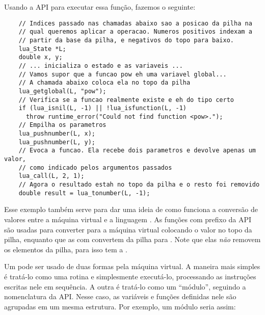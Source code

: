       Usando a API para executar essa função, fazemos o seguinte:
      
      \vspace{1em}

    \begin{lstlisting}
    // Indices passado nas chamadas abaixo sao a posicao da pilha na
    // qual queremos aplicar a operacao. Numeros positivos indexam a
    // partir da base da pilha, e negativos do topo para baixo.
    lua_State *L;
    double x, y;
    // ... inicializa o estado e as variaveis ...
    // Vamos supor que a funcao pow eh uma variavel global...
    // A chamada abaixo coloca ela no topo da pilha
    lua_getglobal(L, "pow");
    // Verifica se a funcao realmente existe e eh do tipo certo
    if (lua_isnil(L, -1) || !lua_isfunction(L, -1)
      throw runtime_error("Could not find function <pow>.");
    // Empilha os parametros
    lua_pushnumber(L, x);
    lua_pushnumber(L, y);
    // Evoca a funcao. Ela recebe dois parametros e devolve apenas um valor,
    // como indicado pelos argumentos passados
    lua_call(L, 2, 1);
    // Agora o resultado estah no topo da pilha e o resto foi removido
    double result = lua_tonumber(L, -1);
    \end{lstlisting}
      
      \vspace{1em}

      Esse exemplo também serve para dar uma ideia de como funciona a conversão
      de valores entre a máquina virtual  e a linguagem
      \C{}\footnotemark{}. As funções com prefixo  da API
      são usadas para converter para a máquina virtual colocando o valor no topo
      da pilha, enquanto que as com  convertem da pilha para
      \C{}. Note que elas \emph{não} removem os elementos da pilha, para isso
      tem a .


      Um \script{}  pode ser usado de duas formas pela máquina
      virtual. A maneira mais simples é tratá-lo como uma rotina e simplesmente
      executá-lo, processando as instruções escritas nele em sequência. A outra
      é tratá-lo como um ``módulo'', seguindo a nomenclatura da API. Nesse caso,
      as variáveis e funções definidas nele são agrupadas em um mesma estrutura.
      Por exemplo, um módulo seria assim:
      
